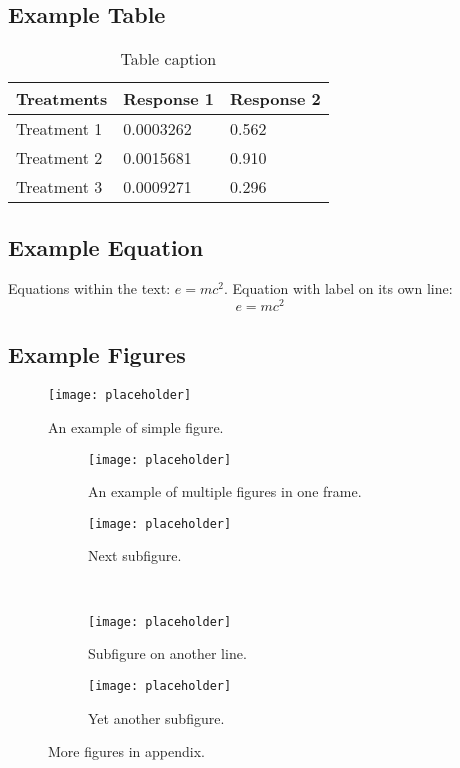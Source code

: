 \subsection*{Example Table}

\begin{table}[h] 
\centering
\begin{tabular}{l l l}
\hline
\textbf{Treatments} & \textbf{Response 1} & \textbf{Response 2}\\
\hline
Treatment 1 & 0.0003262 & 0.562 \\
Treatment 2 & 0.0015681 & 0.910 \\
Treatment 3 & 0.0009271 & 0.296 \\
\hline
\end{tabular}
\caption{Table caption}
\label{tab:example}
\end{table}



\subsection*{Example Equation}
Equations within the text: $e = mc^2$. Equation with label on its own line:
\begin{equation} \label{eq:emc}
    e = mc^2
\end{equation}




\subsection*{Example Figures}

\begin{figure}[ht]
    \centering\texttt{[image: placeholder]}
    \caption{An example of simple figure.}
    \label{fig:example}
\end{figure}

\begin{figure}[ht]
    \centering
    \begin{subfigure}[t]{0.4\textwidth}
        \centering\texttt{[image: placeholder]}
        \caption{An example of multiple figures in one frame.}
        \label{fig:multiple:example11}
    \end{subfigure}
    \begin{subfigure}[t]{0.4\textwidth}
        \centering\texttt{[image: placeholder]}
        \caption{Next subfigure.}
        \label{fig:multiple:example12}
    \end{subfigure}
    \\
    \begin{subfigure}[t]{0.4\textwidth}
        \centering\texttt{[image: placeholder]}
        \caption{Subfigure on another line.}
        \label{fig:multiple:example21}
    \end{subfigure}
    \begin{subfigure}[t]{0.4\textwidth}
        \centering\texttt{[image: placeholder]}
        \caption{Yet another subfigure.}
        \label{fig:multiple:example22}
    \end{subfigure}
    \caption{More figures in appendix.}
    \label{fig:multiple}
\end{figure}